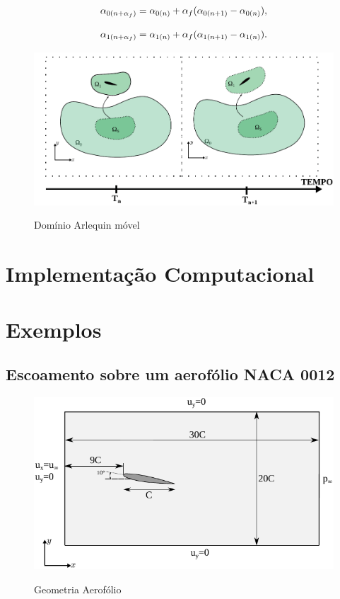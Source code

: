 \documentclass[tese_patricia]{subfiles}
\begin{document}
\begin{align}
	\alpha_{0(n+\alpha_f)} = \alpha_{0(n)} + \alpha_f(\alpha_{0(n+1)} - \alpha_{0(n)}),
\end{align}

\begin{align}
	\alpha_{1(n+\alpha_f)} = \alpha_{1(n)} + \alpha_f(\alpha_{1(n+1)} - \alpha_{1(n)}).
\end{align}

\begin{figure}[htb!]
	\centering 
	{\includegraphics[scale=1.0,trim=0cm 0cm 0cm 0cm, clip=true]{Imagens/Cap6/dominioArlequinMoving.pdf}}	
	\caption{Domínio Arlequin móvel}
	\label{fig:ArlquinMóvel}
\end{figure}


\section{Implementação Computacional}

\section{Exemplos}

\subsection{Escoamento sobre um aerofólio NACA 0012}


\begin{figure}[htb!]
	\centering 
	{\includegraphics[scale=1.0,trim=0cm 0cm 0cm 0cm, clip=true]{Imagens/Cap6/aerofolio.pdf}}	
	\caption{Geometria Aerofólio}
	\label{fig:Aerofolio}
\end{figure}
\end{document}
